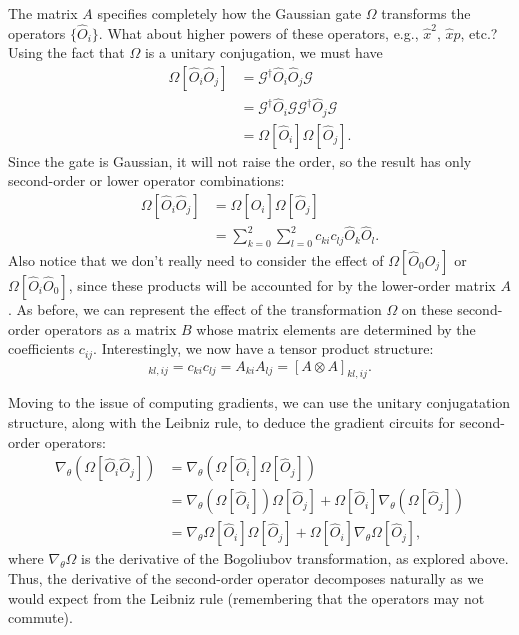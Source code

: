 \documentclass[aps,pra,10pt,twocolumn,groupedaddress,nofootinbib]{revtex4-1}
\theoremstyle{plain}
\begin{document}
The matrix $A$ specifies completely how the Gaussian gate $\Omega$ transforms the operators $\{\hat{O}_i\}$. What about higher powers of these operators, e.g., $\hat{x}^2$, $\hat{x}\hat{p}$, etc.?
Using the fact that $\Omega$ is a unitary conjugation, we must have
\begin{align}
 \Omega[\hat{O}_i\hat{O}_j] 
 & = \mathcal{G}^\dagger \hat{O}_i \hat{O}_j \mathcal{G} \nonumber \\
 & = \mathcal{G}^\dagger \hat{O}_i \mathcal{G} \mathcal{G}^\dagger\hat{O}_j \mathcal{G} \nonumber\\
 & = \Omega[\hat{O}_i] \Omega[\hat{O}_j].
\end{align}
Since the gate is Gaussian, it will not raise the order, so the result has only second-order or lower operator combinations:
\begin{align}
 \Omega[\hat{O}_i\hat{O}_j] 
 & = \Omega[\hat{O}_i] \Omega[\hat{O}_j] \nonumber \\
 & = \sum_{k=0}^2 \sum_{l=0}^2 c_{ki}c_{lj} \hat{O}_k \hat{O}_l.
\end{align}
Also notice that we don't really need to consider the effect of $\Omega[\hat{O}_0\hat{O}_j]$ or $\Omega[\hat{O}_i\hat{O}_0]$, since these products will be accounted for by the lower-order matrix $A$.
As before, we can represent the effect of the transformation $\Omega$ on these second-order operators as a matrix $B$ whose matrix elements are determined by the coefficients $c_{ij}$. Interestingly, we now have a tensor product structure:
\begin{equation}
 [B]_{kl,ij} = c_{ki} c_{lj} = A_{ki}A_{lj} = [A\otimes A]_{kl,ij}.
\end{equation}

Moving to the issue of computing gradients, we can use the unitary conjugatation structure, along with the Leibniz rule, to deduce the gradient circuits for second-order operators:
\begin{align}
 \nabla_\theta\left(\Omega[\hat{O}_i\hat{O}_j] \right)
 & = \nabla_\theta\left(\Omega[\hat{O}_i] \Omega[\hat{O}_j]\right) \nonumber \\
 & = \nabla_\theta\left( \Omega[\hat{O}_i] \right)\Omega[\hat{O}_j] 
 + \Omega[\hat{O}_i]\nabla_\theta \left( \Omega[\hat{O}_j] \right) \nonumber \\
 & = \nabla_\theta\Omega [\hat{O}_i] \Omega[\hat{O}_j] 
 + \Omega[\hat{O}_i]\nabla_\theta \Omega[\hat{O}_j],
\end{align}
where $\nabla_\theta\Omega$ is the derivative of the Bogoliubov transformation, as explored above.
Thus, the derivative of the second-order operator decomposes naturally as we would expect from the Leibniz rule (remembering that the operators may not commute).
\end{document}
